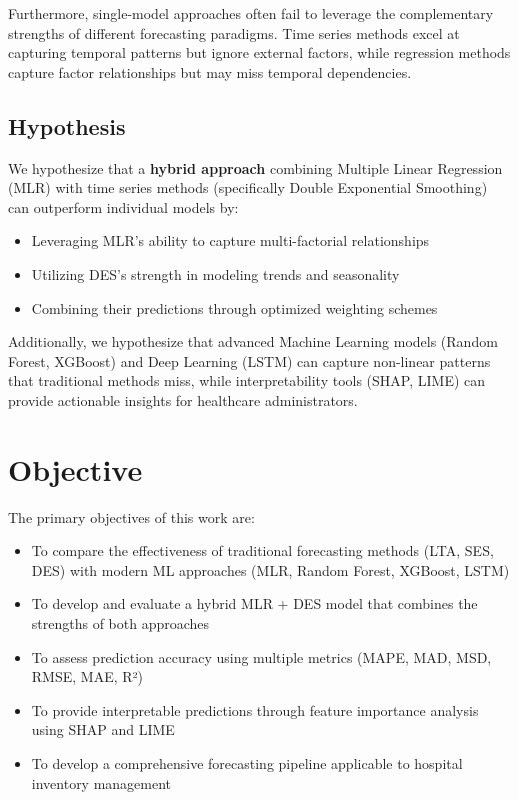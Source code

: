 \documentclass[conference]{IEEEtran}
\begin{document}
Furthermore, single-model approaches often fail to leverage the complementary strengths of different forecasting paradigms. Time series methods excel at capturing temporal patterns but ignore external factors, while regression methods capture factor relationships but may miss temporal dependencies.

\subsection{Hypothesis}

We hypothesize that a \textbf{hybrid approach} combining Multiple Linear Regression (MLR) with time series methods (specifically Double Exponential Smoothing) can outperform individual models by:

\begin{itemize}
    \item Leveraging MLR's ability to capture multi-factorial relationships
    \item Utilizing DES's strength in modeling trends and seasonality
    \item Combining their predictions through optimized weighting schemes
\end{itemize}

Additionally, we hypothesize that advanced Machine Learning models (Random Forest, XGBoost) and Deep Learning (LSTM) can capture non-linear patterns that traditional methods miss, while interpretability tools (SHAP, LIME) can provide actionable insights for healthcare administrators.

\section{Objective}

The primary objectives of this work are:

\begin{itemize}
    \item To compare the effectiveness of traditional forecasting methods (LTA, SES, DES) with modern ML approaches (MLR, Random Forest, XGBoost, LSTM)
    \item To develop and evaluate a hybrid MLR + DES model that combines the strengths of both approaches
    \item To assess prediction accuracy using multiple metrics (MAPE, MAD, MSD, RMSE, MAE, R²)
    \item To provide interpretable predictions through feature importance analysis using SHAP and LIME
    \item To develop a comprehensive forecasting pipeline applicable to hospital inventory management
\end{itemize}
\end{document}
